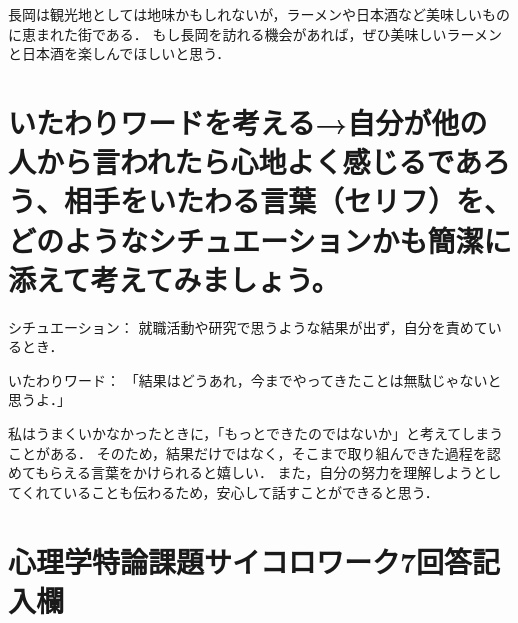 \documentclass[titlepage,a4paper]{jsarticle}
\begin{document}
長岡は観光地としては地味かもしれないが，ラーメンや日本酒など美味しいものに恵まれた街である．
もし長岡を訪れる機会があれば，ぜひ美味しいラーメンと日本酒を楽しんでほしいと思う．

\section{いたわりワードを考える→自分が他の人から言われたら心地よく感じるであろう、相手をいたわる言葉（セリフ）を、どのようなシチュエーションかも簡潔に添えて考えてみましょう。}
シチュエーション：
就職活動や研究で思うような結果が出ず，自分を責めているとき．

いたわりワード：
「結果はどうあれ，今までやってきたことは無駄じゃないと思うよ．」

私はうまくいかなかったときに，「もっとできたのではないか」と考えてしまうことがある．
そのため，結果だけではなく，そこまで取り組んできた過程を認めてもらえる言葉をかけられると嬉しい．
また，自分の努力を理解しようとしてくれていることも伝わるため，安心して話すことができると思う．
\newpage
\section{心理学特論課題サイコロワーク7回答記入欄}
\end{document}
